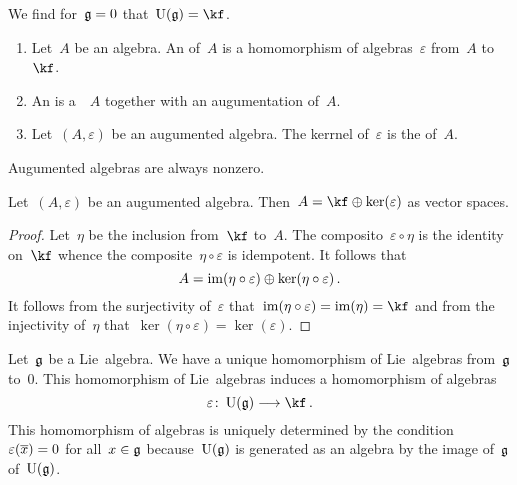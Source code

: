 \begin{example}
  We find for~$\mathfrak{g} = 0$ that~$\Univ(\glie) = \kf$.
\end{example}


\begin{definition}
  \leavevmode
  \begin{enumerate}
    \item
      Let~$A$ be an algebra.
      An  of~$A$ is a homomorphism of algebras~$\varepsilon$ from~$A$ to~$\kf$.
    \item
      An  is a~\algebra{$\kf$}~$A$ together with an augumentation of~$A$.
    \item
      Let~$(A, \varepsilon)$ be an augumented algebra.
      The kerrnel of~$\varepsilon$ is the  of~$A$.
  \end{enumerate}
\end{definition}


\begin{remark}
  Augumented algebras are always nonzero.
\end{remark}


\begin{proposition}
  \label{decomposition for augumented algebra}
  Let~$(A, \varepsilon) $ be an augumented algebra.
  Then~$A = \kf \oplus \ker(\varepsilon)$ as vector spaces.
\end{proposition}


\begin{proof}
  Let~$\eta$ be the inclusion from~$\kf$ to~$A$.
  The composito~$\varepsilon \circ \eta$ is the identity on~$\kf$ whence the composite~$\eta \circ \varepsilon$ is idempotent.
  It follows that
  \[
    A
    =
    \operatorname{im}(\eta \circ \varepsilon)
    \oplus \ker(\eta \circ \varepsilon) \,.
  \]
  It follows from the surjectivity of~$\varepsilon$ that~$\im(\eta \circ \varepsilon) = \im(\eta) = \kf$ and from the injectivity of~$\eta$ that~$\ker(\eta \circ \varepsilon) = \ker(\varepsilon)$.
\end{proof}


\begin{construction}
  \label{construction of counit}
  Let~$\mathfrak{g}$ be a Lie~algebra.
  We have a unique homomorphism of Lie~algebras from~$\mathfrak{g}$ to~$0$.
  This homomorphism of Lie~algebras induces a homomorphism of algebras
  \[
    \varepsilon
    \colon
    \Univ(\glie)
    \to
    \kf \,.
  \]
  This homomorphism of algebras is uniquely determined by the condition~$\varepsilon( \overline{x} ) = 0$ for all~$x \in \mathfrak{g}$ because~$\operatorname{U}(\mathfrak{g})$ is generated as an algebra by the image of~$\mathfrak{g}$ of~$\operatorname{U}(\mathfrak{g})$.
\end{construction}


